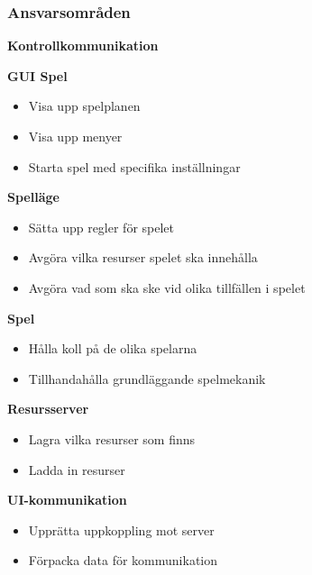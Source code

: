 \subsubsection{Ansvarsområden}
\begin{labeling}{\small{\textbf{Kontrollkommunikation}}}
    \item [\small{\textbf{GUI Spel}}]
        \begin{itemize}
            \item Visa upp spelplanen
            \item Visa upp menyer
            \item Starta spel med specifika inställningar
            \newline
        \end{itemize}

    \item [\small{\textbf{Spelläge}}]
        \begin{itemize}
            \item Sätta upp regler för spelet
            \item Avgöra vilka resurser spelet ska innehålla
            \item Avgöra vad som ska ske vid olika tillfällen i spelet
            \newline
        \end{itemize}

    \item [\small{\textbf{Spel}}]
        \begin{itemize}
            \item Hålla koll på de olika spelarna
            \item Tillhandahålla grundläggande spelmekanik
            \newline
        \end{itemize}

    \item [\small{\textbf{Resursserver}}]
        \begin{itemize}
            \item Lagra vilka resurser som finns
            \item Ladda in resurser
            \newline
        \end{itemize}

    \item [\small{\textbf{UI-kommunikation}}]
        \begin{itemize}
            \item Upprätta uppkoppling mot server
            \item Förpacka data för kommunikation
            \newline
        \end{itemize}


\end{labeling}
